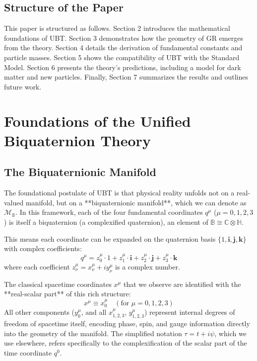 \documentclass[12pt, a4paper]{article}
\begin{document}
\subsection{Structure of the Paper}
This paper is structured as follows. Section 2 introduces the mathematical foundations of UBT. Section 3 demonstrates how the geometry of GR emerges from the theory. Section 4 details the derivation of fundamental constants and particle masses. Section 5 shows the compatibility of UBT with the Standard Model. Section 6 presents the theory's predictions, including a model for dark matter and new particles. Finally, Section 7 summarizes the results and outlines future work.

\section{Foundations of the Unified Biquaternion Theory}

\subsection{The Biquaternionic Manifold}
The foundational postulate of UBT is that physical reality unfolds not on a real-valued manifold, but on a **biquaternionic manifold**, which we can denote as \( \mathcal{M}_{\mathbb{B}} \). In this framework, each of the four fundamental coordinates \(q^\mu\) (\(\mu=0,1,2,3\)) is itself a biquaternion (a complexified quaternion), an element of \( \mathbb{B} \cong \mathbb{C} \otimes \mathbb{H} \).

This means each coordinate can be expanded on the quaternion basis \( \{1, \mathbf{i}, \mathbf{j}, \mathbf{k}\} \) with complex coefficients:
\begin{equation}
    q^\mu = z_0^\mu \cdot 1 + z_1^\mu \cdot \mathbf{i} + z_2^\mu \cdot \mathbf{j} + z_3^\mu \cdot \mathbf{k}
\end{equation}
where each coefficient \( z_\nu^\mu = x_\nu^\mu + i y_\nu^\mu \) is a complex number.

The classical spacetime coordinates \(x^\mu\) that we observe are identified with the **real-scalar part** of this rich structure:
\begin{equation}
    x^\mu \equiv x_0^\mu \quad (\text{for } \mu=0,1,2,3)
\end{equation}
All other components (\(y_0^\mu\), and all \(x_{1,2,3}^\mu\), \(y_{1,2,3}^\mu\)) represent internal degrees of freedom of spacetime itself, encoding phase, spin, and gauge information directly into the geometry of the manifold. The simplified notation \( \tau = t + i\psi \), which we use elsewhere, refers specifically to the complexification of the scalar part of the time coordinate \(q^0\).
\end{document}
